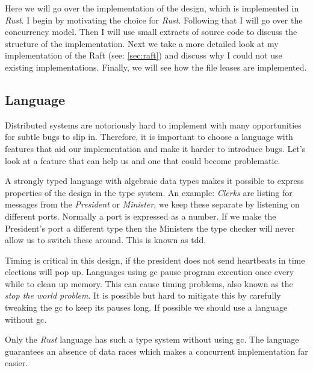 Here we will go over the implementation of the design, which is implemented in \textit{Rust}. I begin by motivating the choice for \textit{Rust}. Following that I will go over the concurrency model. Then I will use small extracts of source code to discuss the structure of the implementation. Next we take a more detailed look at my implementation of the Raft (see: \cref{sec:raft}) and discuss why I could not use existing implementations. Finally, we will see how the file leases are implemented.

\subsection{Language}
Distributed systems are notoriously hard to implement with many opportunities for subtle bugs to slip in. Therefore, it is important to choose a language with features that aid our implementation and make it harder to introduce bugs. Let's look at a feature that can help us and one that could become problematic.

A strongly typed language with algebraic data types makes it possible to express properties of the design in the type system. An example: \textit{Clerks} are listing for messages from the \textit{President} or \textit{Minister}, we keep these separate by listening on different ports. Normally a port is expressed as a number. If we make the President's port a different type then the Ministers the type checker will never allow us to switch these around. This is known as \ac{tdd}.

Timing is critical in this design, if the president does not send heartbeats in time elections will pop up. Languages using \ac{gc} pause program execution once every while to clean up memory. This can cause timing problems, also known as the \textit{stop the world problem}. It is possible but hard to mitigate this by carefully tweaking the \ac{gc} to keep its pauses long. If possible we should use a language without \ac{gc}.

Only the \textit{Rust} language has such a type system without using \ac{gc}. The language guarantees an absence of data races which makes a concurrent implementation far easier.

